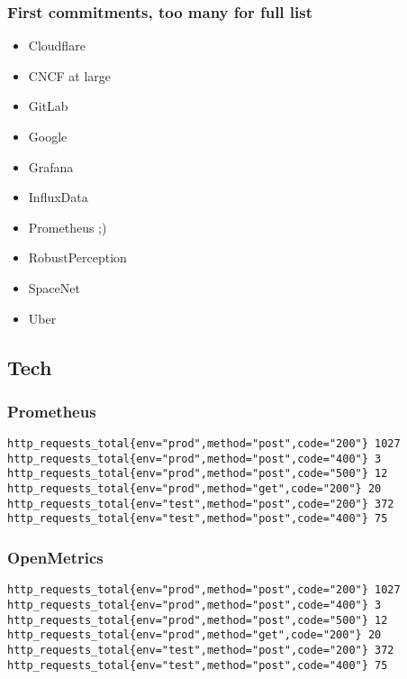 \documentclass[aspectratio=169]{beamer}
\begin{document}
\begin{frame}
	\frametitle{First commitments, too many for full list}
	\vfill
	\begin{itemize}
		\item Cloudflare
		\item CNCF at large
		\item GitLab
		\item Google
		\item Grafana
		\item InfluxData
		\item Prometheus ;)
		\item RobustPerception
		\item SpaceNet
		\item Uber
	\end{itemize}
	\vfill
\end{frame}


\subsection{Tech}

\begin{frame}[fragile]
        \frametitle{Prometheus}
        \fontsize{10pt}{12}\selectfont
        \begin{verbatim}
http_requests_total{env="prod",method="post",code="200"} 1027
http_requests_total{env="prod",method="post",code="400"} 3
http_requests_total{env="prod",method="post",code="500"} 12
http_requests_total{env="prod",method="get",code="200"} 20
http_requests_total{env="test",method="post",code="200"} 372
http_requests_total{env="test",method="post",code="400"} 75
        \end{verbatim}
\end{frame}

\begin{frame}[fragile]
        \frametitle{OpenMetrics}
        \fontsize{10pt}{12}\selectfont
        \begin{verbatim}
http_requests_total{env="prod",method="post",code="200"} 1027
http_requests_total{env="prod",method="post",code="400"} 3
http_requests_total{env="prod",method="post",code="500"} 12
http_requests_total{env="prod",method="get",code="200"} 20
http_requests_total{env="test",method="post",code="200"} 372
http_requests_total{env="test",method="post",code="400"} 75
        \end{verbatim}
\end{frame}
\end{document}
